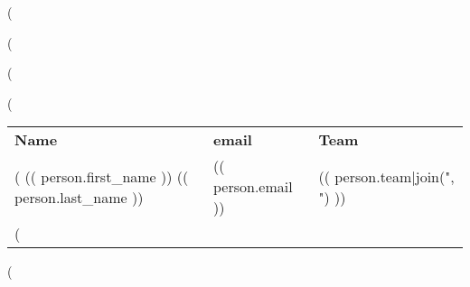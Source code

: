 (%

(%
\usepackage{longtable}
(%

(%

\begin{longtable}{lll}
\textbf{Name}&\textbf{email}&\textbf{Team}\\
(%
(( person.first_name )) (( person.last_name ))&(( person.email ))&(( person.team|join(", ") )) \\
(%
\end{longtable}

(%